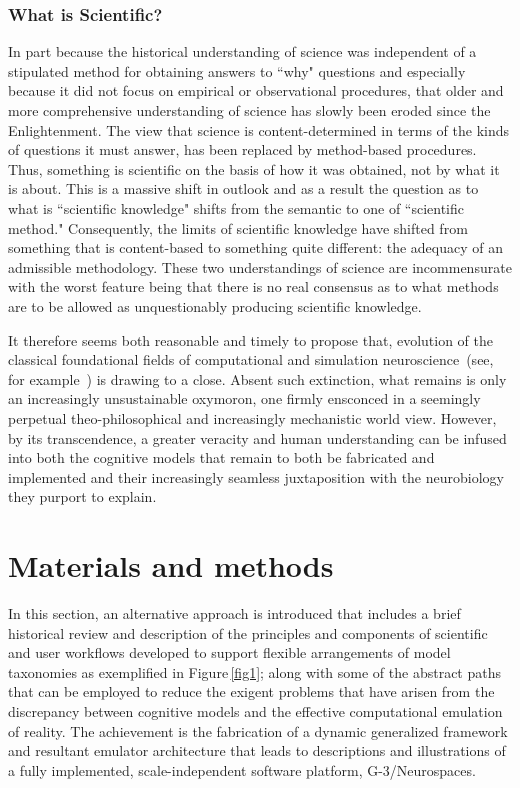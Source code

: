 \documentclass[10pt,letterpaper]{article}
\begin{document}
\subsubsection*{What is Scientific?}
In part because the historical understanding of science was independent of a stipulated method for obtaining answers to ``why" questions and especially because it did not focus on empirical or observational procedures, that older and more comprehensive understanding of science has slowly been eroded since the Enlightenment. The view that science is content-determined in terms of the kinds of questions it must answer, has been replaced by method-based procedures. Thus, something is scientific on the basis of how it was obtained, not by what it is about. This is a massive shift in outlook and as a result the question as to what is ``scientific knowledge" shifts from the semantic to one of ``scientific method." Consequently, the limits of scientific knowledge have shifted from something that is content-based to something quite different: the adequacy of an admissible methodology. These two understandings of science are incommensurate with the worst feature being that there is no real consensus as to what methods are to be allowed as unquestionably producing scientific knowledge.

It therefore seems both reasonable and timely to propose that, evolution of the classical foundational fields of computational and simulation neuroscience~(see, for example~\cite{fan19,swanson15,swanson10}) is drawing to a close. Absent such extinction, what remains is only an increasingly unsustainable oxymoron, one firmly ensconced in a seemingly perpetual theo-philosophical and increasingly mechanistic world view. However, by its transcendence, a greater veracity and human understanding can be infused into both the cognitive models that remain to both be fabricated and implemented and their increasingly seamless juxtaposition with the neurobiology they purport to explain. %

\section*{Materials and methods}

In this section, an alternative approach is introduced that includes a brief historical review and description of the principles and components of scientific and user workflows developed to support flexible arrangements of model taxonomies as exemplified in Figure\,\ref{fig1}; along with some of the abstract paths that can be employed to reduce the exigent problems that have arisen from the discrepancy between cognitive models and the effective computational emulation of reality. The achievement is the fabrication of a dynamic generalized framework and resultant emulator architecture that leads to descriptions and illustrations of a fully implemented, scale-independent software platform, G-3/Neurospaces.
\end{document}
